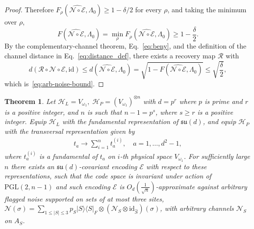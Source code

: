 \documentclass[11pt,letterpaper]{article}
\theoremstyle{plain}
\theoremstyle{plain}
\theoremstyle{plain}
\theoremstyle{plain}
\theoremstyle{plain}
\theoremstyle{plain}
\theoremstyle{plain}
\newtheorem{smtheorem}{Theorem}[section]
\theoremstyle{definition}
\theoremstyle{plain}
\begin{document}
\begin{proof}
    Therefore $F_\rho(\widehat{\mathcal N\circ\mathcal E},\Lambda_0)\ge1-\delta/2$ for every $\rho$, and taking the minimum over $\rho$,
    \[
        F(\widehat{\mathcal N\circ\mathcal E},\Lambda_0)
        =
        \min_\rho
        F_\rho(\widehat{\mathcal N\circ\mathcal E},\Lambda_0)
        \geq
        1-\frac{\delta}{2}.
    \]
    By the complementary-channel theorem, Eq.~\eqref{eq:beny}, and the definition of the channel distance in Eq.~\eqref{eq:distance_def}, 
    there exists a recovery map $\mathcal R$ with
    \[
        d(\mathcal R\circ\mathcal N\circ\mathcal E,\mathrm{id})
        \le
        d\left(\widehat{\mathcal N\circ\mathcal E},\Lambda_0\right)
        =
        \sqrt{1-F\left(\widehat{\mathcal N\circ\mathcal E},\Lambda_0\right)}
        \le
        \sqrt{\frac\delta2},
    \]
    which is~\eqref{eq:arb-noise-bound}.
\end{proof}

\begin{smtheorem}\label{thrm:3_transitive_scale}
    Let
    $
        \mathcal H_L=V_{\omega_1},\;
        \mathcal H_P=(V_{\omega_1})^{\otimes n}
    $
    with $d=p^r$ where $p$ is prime and $r$ is a positive integer, 
    and $n$ is such that $n-1=p^s$, where $s \geq r$ is a positive integer. 
    Equip \(\mathcal H_L\) with the fundamental representation of
    \(\mathfrak{su}(d)\), and equip \(\mathcal H_P\) with the transversal
    representation given by
    \begin{equation}
    \begin{gathered}
    t_a \rightarrow \sum_{i=1}^n t_a^{(i)}, \quad a=1,\ldots,d^2-1,
    \end{gathered}
    \end{equation} 
    where $t_a^{(i)}$ is a fundamental of $t_a$ on $i$-th physical space $V_{\omega_1}$. For sufficiently
    large $n$ there exists an $\mathfrak{su}(d)$-covariant encoding $\mathcal{E}$ with respect to these representations, 
    such that the code space is invariant under action of $\mathrm{PGL}(2, n-1)$ and such encoding $\mathcal{E}$ is $O_{d}\left(\frac{1}{\sqrt{n}}\right)$-approximate 
    against arbitrary flagged noise supported on sets of at most three sites, $\mathcal{N}(\sigma)=\sum_{1\leq|S|\leq3} p_S|S\rangle\langle S|_F \otimes\left(\mathcal{N}_S \otimes \mathrm{id}_{\hat S}\right)(\sigma)$, 
    with arbitrary channels $\mathcal N_S$ on $A_S$.
\end{smtheorem}
\end{document}
